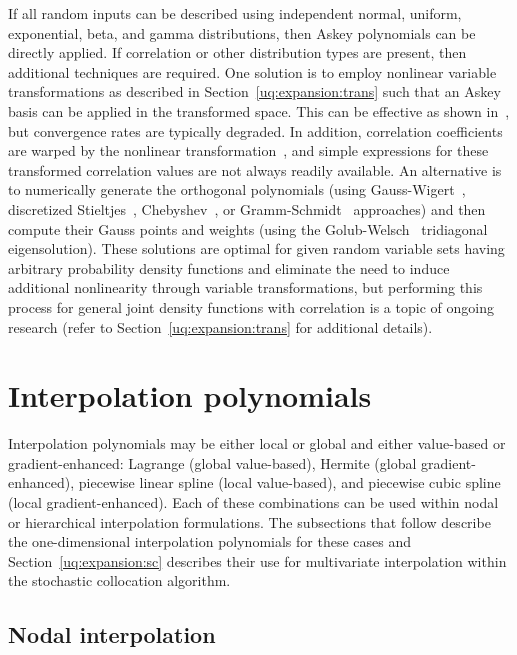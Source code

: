 If all random inputs can be described using independent normal, 
uniform, exponential, beta, and gamma distributions, then Askey 
polynomials can be directly applied.  If correlation or other distribution
types are present, then additional techniques are required.  One
solution is to employ nonlinear variable transformations as described
in Section~\ref{uq:expansion:trans} such that an Askey basis can be 
applied in the transformed space.  This can be effective as shown
in~\cite{Eld07}, but convergence rates are typically degraded.  In
addition, correlation coefficients are warped by the nonlinear
transformation~\cite{Der86}, and simple expressions for these
transformed correlation values are not always readily available.  An
alternative is to numerically generate the orthogonal polynomials
(using Gauss-Wigert~\cite{simpson_gw}, discretized
Stieltjes~\cite{gautschi_book}, Chebyshev~\cite{gautschi_book}, or
Gramm-Schmidt~\cite{WillBijl06} approaches) and then compute their
Gauss points and weights (using the Golub-Welsch~\cite{GolubWelsch69}
tridiagonal eigensolution).  These solutions are optimal for given
random variable sets having arbitrary probability density functions and 
eliminate the need to induce additional nonlinearity through variable
transformations, but performing this process for general joint density
functions with correlation is a topic of ongoing research (refer to
Section~\ref{uq:expansion:trans} for additional details).

\section{Interpolation polynomials} \label{uq:expansion:interp}

Interpolation polynomials may be either local or global and either
value-based or gradient-enhanced: Lagrange (global value-based),
Hermite (global gradient-enhanced), piecewise linear spline (local
value-based), and piecewise cubic spline (local gradient-enhanced).
Each of these combinations can be used within nodal or hierarchical
interpolation formulations.  The subsections that follow describe the
one-dimensional interpolation polynomials for these cases and
Section~\ref{uq:expansion:sc} describes their use for multivariate
interpolation within the stochastic collocation algorithm.

\subsection{Nodal interpolation} \label{uq:expansion:interp:nodal}


